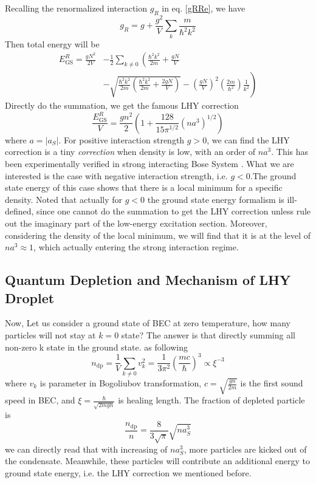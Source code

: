 Recalling the renormalized interaction $g_R$ in eq. \ref{gRRe}, we have
\begin{equation}
g_R=g+\frac{g^2}{V}\sum _k \frac{m}{\hbar ^2k^2}
\end{equation}
Then total energy will be
\begin{equation}
\begin{split}
E_{\text{GS}}^R=\frac{gN^2}{2V}&-\frac{1}{2}\sum_{k\neq0}\left(\frac{\hbar ^2k^2}{2m}+\frac{gN}{V}\right.\\
&\left.-\sqrt{\frac{\hbar^2k^2}{2m}\left(\frac{\hbar^2k^2}{2m}+\frac{2gN}{V}\right)}-\left(\frac{gN}{V}\right)^2\left(\frac{2m}{\hbar ^2}\right)\frac{1}{k^2}\right)
\end{split}
\end{equation}
Directly do the summation, we get the famous LHY correction
\begin{equation}
\frac{E_{\text{GS}}^R}{V}=\frac{g n^2}{2}\left(1+\frac{128}{15\pi ^{1/2}} \left(n a^3\right)^{1/2}\right)
\end{equation}
where $a=\left|a_S\right|$. For positive interaction strength $g>0$, we can find the LHY correction is a tiny \textit{correction} when density is low, with an order of $na^3$. This has been experimentally verified in strong interacting Bose System \cite{Navon2011}. What we are interested is the case with negative interaction strength, i.e. $g<0$.The ground state energy of this case shows that there is a local minimum for a specific density. Noted that actually for $g<0$ the ground state energy formalism is ill-defined, since one cannot do the summation to get the LHY correction unless rule out the imaginary part of the low-energy excitation section. Moreover, considering the density of the local minimum, we will find that it is at the level of $na^3 \approx 1$, which actually entering the strong interaction regime.

\subsection{Quantum Depletion and Mechanism of LHY Droplet}
Now, Let us consider a ground state of BEC at zero temperature, how many particles will not stay at $k=0$ state? The answer is that directly summing all non-zero k state in the ground state. as following
\begin{equation}
n_{\text{dp}}=\frac{1}{V}\sum _{k\neq 0} v_k^2=\frac{1}{3\pi ^2}\left(\frac{m c}{\hbar }\right)^3\propto \xi ^{-3}
\end{equation}
where $v_k$ is parameter in Bogoliubov transformation, $c =\sqrt{\frac{g n}{2m}}$ is the first sound speed in BEC, and $\xi =\frac{\hbar }{\sqrt{2m g n}}$ is healing length.
The fraction of depleted particle is
\begin{equation}
\frac{n_{\text{dp}}}{n}=\frac{8}{3\sqrt{\pi }}\sqrt{n a_S^3}
\end{equation}
we can directly read that with increasing of $n a_S^3$, more particles are kicked out of the condensate. Meanwhile, these particles will contribute an additional energy to ground state energy, i.e. the LHY correction we mentioned before.

